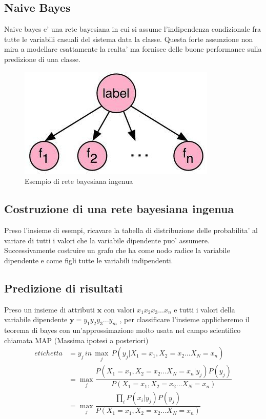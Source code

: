 \subsection{Naive Bayes}
Naive bayes e' una rete bayesiana in cui si assume l'indipendenza condizionale fra tutte le variabili casuali del sistema data la classe. Questa forte assunzione non mira a modellare esattamente la realta' ma fornisce delle buone performance sulla predizione di una classe.

\begin{figure}[H]
	\centering
	\includegraphics[width=0.4\linewidth]{img/naive_bayes_example}
	\caption{Esempio di rete bayesiana ingenua}
	\label{fig:naivebayesexample}
\end{figure}

\subsection{Costruzione di una rete bayesiana ingenua}
Preso l'insieme di esempi, ricavare la tabella di distribuzione delle probabilita' al variare di tutti i valori che la variabile dipendente puo' assumere. Successivamente costruire un grafo che ha come nodo radice la variabile dipendente e come figli tutte le variabili indipendenti.
\medskip
\subsection{Predizione di risultati}
Preso un insieme di attributi $\textbf{x}$ con valori $x_1x_2x_3...x_n$ e tutti i valori della variabile dipendente $\textbf{y}=y_1y_2y_3...y_m$ , per classificare l'insieme applicheremo il teorema di bayes con un'approssimazione molto usata nel campo scientifico chiamata MAP (Massima ipotesi a posteriori)
\begin{align*}
		etichetta &=y_j \, in \, \max_j\,P(y_j|X_1=x_1, X_2=x_2...X_N=x_n) \\
		&= \max_j \dfrac{P(X_1=x_1,X_2=x_2...X_N=x_n|y_j)P(y_j)}{P(X_1=x_1, X_2=x_2...X_N=x_n)}\\
		&= \max_j \dfrac{\prod_iP(x_i|y_j)P(y_j)}{P(X_1=x_1, X_2=x_2...X_N=x_n)}
\end{align*}

